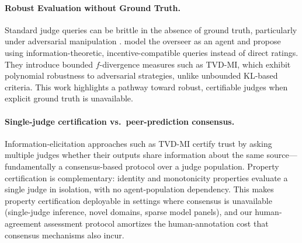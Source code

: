 \documentclass{article}
\begin{document}
\paragraph{Robust Evaluation without Ground Truth.}
Standard judge queries can be brittle in the absence of ground truth, particularly under adversarial manipulation \citep{Zhuo2024ICEScore,TongZhang2024CodeJudge}. \citet{robertson2025stepbystep} model the overseer as an agent and propose using information-theoretic, incentive-compatible queries instead of direct ratings. They introduce bounded $f$-divergence measures such as TVD-MI, which exhibit polynomial robustness to adversarial strategies, unlike unbounded KL-based criteria. This work highlights a pathway toward robust, certifiable judges when explicit ground truth is unavailable.

\paragraph{Single-judge certification vs.\ peer-prediction consensus.}
Information-elicitation approaches such as TVD-MI \citep{robertson2025stepbystep} certify trust by asking multiple judges whether their outputs share information about the same source---fundamentally a consensus-based protocol over a judge population.
Property certification is complementary: identity and monotonicity properties evaluate a single judge in isolation, with no agent-population dependency.
This makes property certification deployable in settings where consensus is unavailable (single-judge inference, novel domains, sparse model panels), and our human-agreement assessment protocol amortizes the human-annotation cost that consensus mechanisms also incur.
\end{document}
